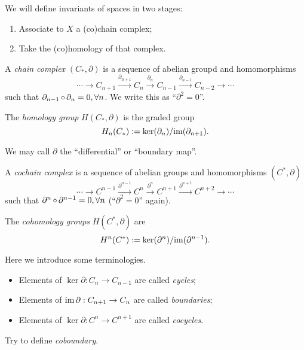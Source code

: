 \documentclass[a4paper,11pt]{article}
\begin{document}
	We will define invariants of spaces in two stages:
	\begin{enumerate}
		\item Associate to $X$ a (co)chain complex;
		\item Take the (co)homology of that complex. 
	\end{enumerate}

	\begin{defi}
		A \emph{chain complex} $(C_* , \partial)$ is a sequence of abelian groupd and homomorphisms
		\[
			\cdots \to C_{n+1} \xrightarrow{\partial_{n+1}} C_n \xrightarrow{\partial_n}C_{n-1} \xrightarrow{\partial_{n-1}} C_{n-2} \to \cdots
		\]
		such that $\partial_{n-1} \operatorname{\circ} \partial_n = 0, \forall n$. We write this as ``$\partial^2 = 0$''.

		The \emph{homology group} $H (C_*, \partial)$ is the graded group 
		\[
			H_n (C_*) := {\ker (\partial_n)}/{\operatorname{im} (\partial_{n+1})}.
		\]
	\end{defi}
	\begin{nt}
		We may call $\partial$ the ``differential'' or ``boundary map''.
	\end{nt}

	\begin{defi}
		A \emph{cochain complex} is a sequence of abelian groups and homomorphisms $(C^*, \partial)$
		\[
			\cdots \to C^{n-1} \xrightarrow{\partial^{n-1}} C^n \xrightarrow{\partial^n} C^{n+1} \xrightarrow{\partial^{n+1}} C^{n+2} \to \cdots
		\]
		such that $\partial^n \operatorname{\circ} \partial^{n-1} = 0, \forall n$ (``$\partial^2 = 0$'' again).

		The \emph{cohomology groups} $H(C^*, \partial)$ are
		\[
			H^n (C^*) := {\ker(\partial^n)}/{\operatorname{im}(\partial^{n-1})}.
		\]
	\end{defi}

	\begin{nt}
		Here we introduce some terminologies.
		\begin{itemize}
			\item Elements of $\ker \partial : C_n \to C_{n-1}$ are called \emph{cycles};
			\item Elements of $\operatorname{im} \partial : C_{n+1} \to C_n$ are called \emph{boundaries};
			\item Elements of $\ker \partial : C^n \to C^{n+1}$ are called \emph{cocycles}. 
		\end{itemize}
	\end{nt}
	\begin{exer}
		Try to define \emph{coboundary}.
	\end{exer}
\end{document}
